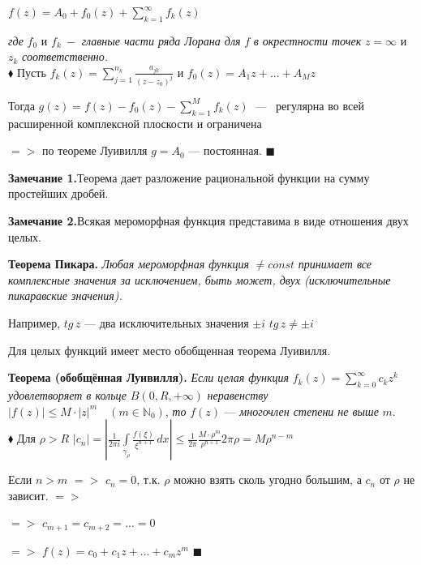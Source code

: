 \documentclass[a4paper, 12pt]{report}
\begin{document}
\begin{center}
    $f(z) = A_0 + f_0(z) + \sum\limits_{k=1}^\infty f_k(z)$
\end{center}
\par \textit{где} $f_0$ и $f_k\ -$ \textit{главные части ряда Лорана для} $f$ \textit{в окрестности точек} $z = \infty$ и $z_k$ \textit{соответственно.}
\\ $\blacklozenge$ \hspace{1 mm} Пусть $f_k(z) = \sum\limits_{j=1}^{n_k} \frac{a_{jk}}{(z-z_0)^j}$ \quad и \quad $f_0(z) = A_1 z + ... + A_M z$
\par Тогда $g(z) = f(z) - f_0(z) - \sum\limits_{k=1}^{M} f_k(z)\ $ --- \  регулярна во всей расширенной комплексной плоскости и ограничена\par 
$=>$ \quad по теореме Луивилля $g = A_0$ --- постоянная. $\blacksquare$
\par\bigskip \textbf{Замечание 1.}\quad Теорема дает разложение рациональной функции на сумму простейших дробей.
\par\bigskip \textbf{Замечание 2.}\quad Всякая мероморфная функция представима в виде отношения двух целых.
\par\bigskip \textbf{Теорема Пикара.} \quad \textit{Любая мероморфная функция} $\not=  const$ \textit{принимает все комплексные значения за исключением, быть может, двух (исключительные пикаравские значения).}
\par\bigskip Например, $tg\,z$ --- два исключительных значения $\pm i$ \quad $tg\,z \not= \pm i$
\par\bigskip Для целых функций имеет место обобщенная теорема Луивилля.
\par \textbf{Теорема (обобщённая Луивилля).} \quad \textit{Если целая функция} $f_k(z) = \sum\limits_{k=0}^{\infty} c_k z^k$ \textit{удовлетворяет в кольце} $B(0, R, +\infty)$ \textit{неравенству} \\ $|f(z)| \le M\cdot |z|^m \quad (m \in \mathbb{N}_0)$, \textit{то} $f(z)$ --- \textit{многочлен степени не выше} $m$.
\\ $\blacklozenge$ \hspace{1 mm} Для $\rho > R$ \quad $|c_n| = |\frac{1}{2\pi i} \int\limits_{\gamma_\rho}^{} \frac{f(\xi)}{\xi^{n+1}}\, dx| \le \frac{1}{2\pi} \frac{M \cdot \rho^m}{\rho^{n+1}} 2\pi \rho = M \rho^{n-m}$
\par Если $n > m$ \quad $=>$ \quad $c_n = 0$, т.к. $\rho$ можно взять сколь угодно большим, а $c_n$ от $\rho$ не зависит. \quad $=>$ \quad \par 
$=>$ \quad $c_{m+1} = c_{m+2} = ... = 0$
\par $=>$ \quad $f(z) = c_0 + c_1 z + ... + c_m z^m$  $\blacksquare$
	
\end{document}
